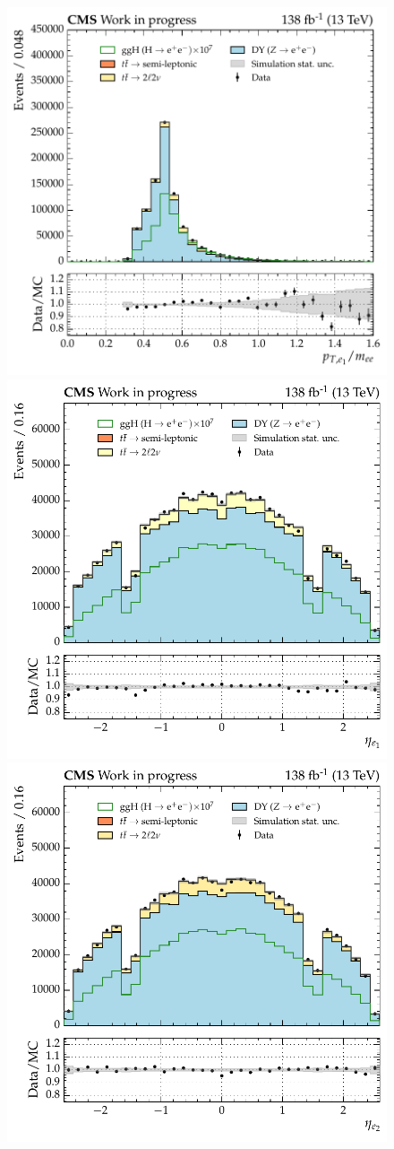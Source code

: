 \begin{figure}[htbp!]
\includegraphics[width =0.33\linewidth]{Figures/Hee/ggH/dataMC/all_inputs/ggH_BDT_pt_reweighted_leadElectronPtOvM.pdf}\hfill%
\includegraphics[width =0.33\linewidth]{Figures/Hee/ggH/dataMC/all_inputs/ggH_BDT_pt_reweighted_leadElectronEta.pdf}\hfill%
\includegraphics[width =0.33\linewidth]{Figures/Hee/ggH/dataMC/all_inputs/ggH_BDT_pt_reweighted_subleadElectronEta.pdf}\hfill%
 

\end{figure}
